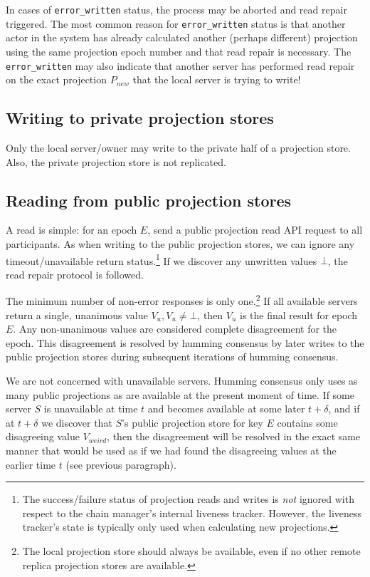 \documentclass[preprint,10pt]{sigplanconf}
\begin{document}
In cases of {\tt error\_written} status,
the process may be aborted and read repair
triggered.  The most common reason for {\tt error\_written} status
is that another actor in the system has
already calculated another (perhaps different) projection using the
same projection epoch number and that
read repair is necessary.  The {\tt error\_written} may also
indicate that another server has performed read repair on the exact
projection $P_{new}$ that the local server is trying to write!

\subsection{Writing to private projection stores}

Only the local server/owner may write to the private half of a
projection store.  Also, the private projection store is not replicated.

\subsection{Reading from public projection stores}
\label{sub:proj-store-reading}

A read is simple: for an epoch $E$, send a public projection read API
request to all participants.  As when writing to the public projection
stores, we can ignore any timeout/unavailable return
status.\footnote{The success/failure status of projection reads and
  writes is {\em not} ignored with respect to the chain manager's
  internal liveness tracker.  However, the liveness tracker's state is
  typically only used when calculating new projections.}  If we
discover any unwritten values $\bot$, the read repair protocol is
followed.

The minimum number of non-error responses is only one.\footnote{The local
projection store should always be available, even if no other remote
replica projection stores are available.}  If all available servers
return a single, unanimous value $V_u, V_u \ne \bot$, then $V_u$ is
the final result for epoch $E$.
Any non-unanimous values are considered complete disagreement for the
epoch.  This disagreement is resolved by humming consensus by later
writes to the public projection stores during subsequent iterations of
humming consensus.

We are not concerned with unavailable servers.  Humming consensus
only uses as many public projections as are available at the present
moment of time.  If some server $S$ is unavailable at time $t$ and
becomes available at some later $t+\delta$, and if at $t+\delta$ we
discover that $S$'s public projection store for key $E$
contains some disagreeing value $V_{weird}$, then the disagreement
will be resolved in the exact same manner that would be used as if we
had found the disagreeing values at the earlier time $t$ (see previous
paragraph).
\end{document}
